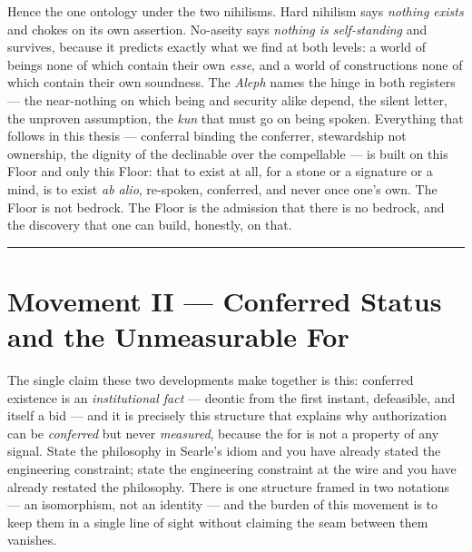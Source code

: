 \documentclass[11pt]{article}
\begin{document}
Hence the one ontology under the two nihilisms. Hard nihilism says \emph{nothing exists} and chokes on its own assertion. No-aseity says \emph{nothing is self-standing} and survives, because it predicts exactly what we find at both levels: a world of beings none of which contain their own \emph{esse}, and a world of constructions none of which contain their own soundness. The \emph{Aleph} names the hinge in both registers — the near-nothing on which being and security alike depend, the silent letter, the unproven assumption, the \emph{kun} that must go on being spoken. Everything that follows in this thesis — conferral binding the conferrer, stewardship not ownership, the dignity of the declinable over the compellable — is built on this Floor and only this Floor: that to exist at all, for a stone or a signature or a mind, is to exist \emph{ab alio}, re-spoken, conferred, and never once one's own. The Floor is not bedrock. The Floor is the admission that there is no bedrock, and the discovery that one can build, honestly, on that.

\medskip\noindent\rule{\linewidth}{0.3pt}\medskip

\section*{Movement II — Conferred Status and the Unmeasurable For}

The single claim these two developments make together is this: conferred existence is an \emph{institutional fact} — deontic from the first instant, defeasible, and itself a bid — and it is precisely this structure that explains why authorization can be \emph{conferred} but never \emph{measured}, because the for is not a property of any signal. State the philosophy in Searle's idiom and you have already stated the engineering constraint; state the engineering constraint at the wire and you have already restated the philosophy. There is one structure framed in two notations — an isomorphism, not an identity — and the burden of this movement is to keep them in a single line of sight without claiming the seam between them vanishes.
\end{document}
